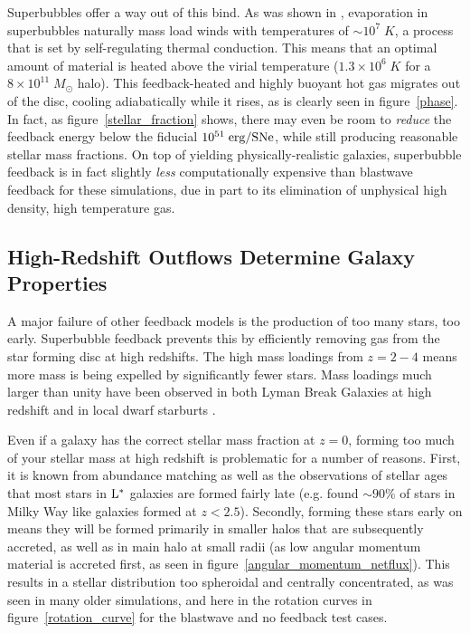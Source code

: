 Superbubbles offer a way out of this bind. As was shown in \citep{Keller2014},
evaporation in superbubbles naturally mass load winds with temperatures of
$\sim10^7\;K$, a process that is set by self-regulating thermal conduction.
This means that an optimal amount of material is heated above the virial
temperature ($1.3\times10^6\;K$ for a $8\times10^{11}\;M_\odot$ halo).  This
feedback-heated and highly buoyant hot gas migrates out of the disc, cooling
adiabatically while it rises, as is clearly seen in figure~\ref{phase}.   In
fact, as figure~\ref{stellar_fraction} shows, there may even be room to {\it
reduce} the feedback energy below the fiducial $10^{51}\;\rm erg/SNe$, while
still producing reasonable stellar mass fractions.  On top of yielding
physically-realistic galaxies, superbubble feedback is in fact slightly
\textit{less} computationally expensive than blastwave feedback for these
simulations, due in part to its elimination of unphysical high density, high
temperature gas.

\subsection{High-Redshift Outflows Determine Galaxy Properties}

A major failure of other feedback models is 
the production of too many stars, too early.  Superbubble feedback prevents this
by efficiently removing gas from the star forming disc at high redshifts.  The
high mass loadings from $z=2-4$ means more mass is being expelled by
significantly fewer stars.  Mass loadings much larger than unity have been
observed in both Lyman Break Galaxies at high redshift \citep{Pettini2002} and
in local dwarf starburts \citep{Martin2002}.  

Even if a galaxy has the correct stellar mass fraction at $z=0$, forming too
much of your stellar mass at high redshift is problematic for a number of
reasons.  First, it is known from abundance matching as well as the observations
of stellar ages that most stars in $\rm{L^*}$ galaxies are formed fairly late
(e.g. \citet{vanDokkum2013} found $\sim90\%$ of stars in Milky Way like galaxies
formed at $z<2.5$).  Secondly, forming these stars early on means they will be
formed primarily in smaller halos that are subsequently accreted, as well as in
main halo at small radii (as low angular momentum material is accreted first, as
seen in figure~\ref{angular_momentum_netflux}). This results in a stellar
distribution too spheroidal and centrally concentrated, as was seen in many
older simulations, and here in the rotation curves in
figure~\ref{rotation_curve} for the blastwave and no feedback test cases.

